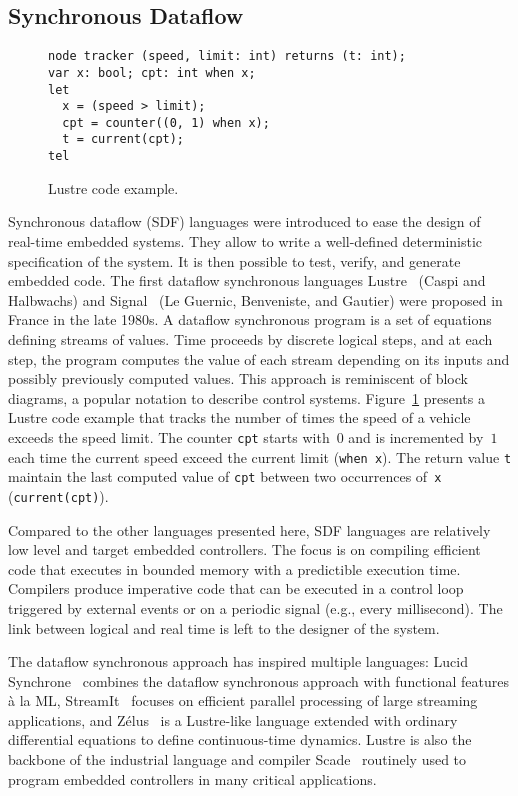 \subsection{Synchronous Dataflow}\label{sec:sdf} %

\begin{figure}[!h]
\begin{lstlisting}
node tracker (speed, limit: int) returns (t: int);
var x: bool; cpt: int when x;
let
  x = (speed > limit);
  cpt = counter((0, 1) when x);
  t = current(cpt);
tel
\end{lstlisting}
\vspace*{-4mm}
\caption{\label{fig:lustre} Lustre code example.}
\end{figure}

Synchronous dataflow (SDF) languages were introduced to ease the design of
real-time embedded systems. They allow to write a well-defined
deterministic specification of the system. It is then possible to
test, verify, and generate embedded code.
The first data\-flow synchronous languages Lustre~\cite{lustre_1987}
(Caspi and Halbwachs) and Signal~\cite{signal_1991} (Le Guernic,
Benveniste, and Gautier) were proposed in France in the late 1980s.
A dataflow synchronous program is a set of equations defining streams
of values. Time proceeds by discrete logical steps, and at each step,
the program computes the value of each stream depending on its inputs
and possibly previously computed values.
This approach is reminiscent of block diagrams, a popular notation to
describe control systems.
Figure~\ref{fig:lustre} presents a Lustre code example that tracks the
number of times the speed of a vehicle exceeds the speed limit. The
counter \lstinline{cpt} starts with~$0$ and is incremented by~$1$ each
time the current speed exceed the current limit (\lstinline{when x}).
The return value \lstinline{t} maintain the last computed value
of \lstinline{cpt} between two occurrences of~\lstinline{x}
(\lstinline{current(cpt)}).


Compared to the other languages presented here, SDF
languages are relatively low level and target embedded
controllers. The focus is on compiling efficient code that executes
in bounded memory with a predictible execution time. Compilers produce
imperative code that can be executed in a control loop triggered by
external events or on a periodic signal (e.g., every millisecond). The
link between logical and real time is left to the designer of the
system.


The dataflow synchronous approach has inspired
multiple languages: Lucid Synchrone~\cite{lucid_2006} combines the
dataflow synchronous approach with functional features \`a la ML,
StreamIt~\cite{streamit_2002} focuses on efficient parallel processing of large
streaming applications, and Z\'elus~\cite{zelus_2013} is a Lustre-like
language extended with ordinary differential equations to define
contin\-uous-time dynamics. Lustre is also the backbone of the
industrial language and compiler Scade~\cite{scade_2017} routinely
used to program embedded controllers in many critical applications.
